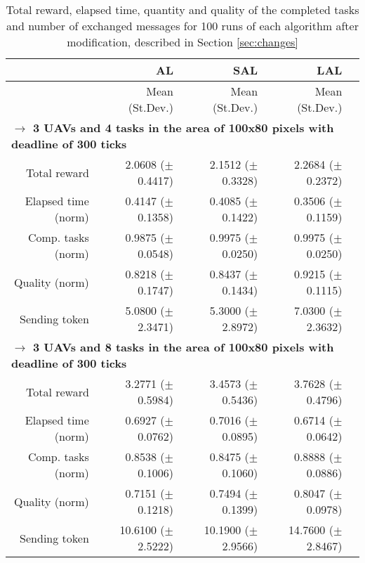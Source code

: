 \begin{table}%
	\small
	\fontsize{6}{6}\selectfont
	\centering
	\caption{Total reward, elapsed time, quantity and quality of the completed tasks and number of exchanged messages for 100 runs of each algorithm after modification, described in Section \ref{sec:changes}}
	\label{table:table06}
	
	\begin{tabular}{rrrrr} \hline
		& AL
		& SAL
		& LAL \\ \hline 
		
		& Mean (St.Dev.)  & Mean (St.Dev.)  & Mean (St.Dev.)  \\ [1ex]
		
		\multicolumn{5}{l}{\textbf{$\longrightarrow$ 3 UAVs and 4 tasks in the area of 100x80 pixels with deadline of 300 ticks }} \\
	Total reward           & 2.0608   ($\pm$0.4417)  &  2.1512  ($\pm$0.3328) & 2.2684  ($\pm$0.2372)   \\
	Elapsed time (norm)    & 0.4147   ($\pm$0.1358)  &  0.4085  ($\pm$0.1422) & 0.3506  ($\pm$0.1159)    \\ 
	Comp. tasks (norm)     & 0.9875   ($\pm$0.0548)  &  0.9975  ($\pm$0.0250) & 0.9975  ($\pm$0.0250)    \\ 
	Quality (norm)         & 0.8218   ($\pm$0.1747)  &  0.8437  ($\pm$0.1434) & 0.9215  ($\pm$0.1115)   \\ 
	Sending token          &  5.0800  ($\pm$2.3471)  &  5.3000  ($\pm$2.8972) & 7.0300  ($\pm$2.3632)   \\ [1ex]
		
		\multicolumn{5}{l}{\textbf{$\longrightarrow$ 3 UAVs and 8 tasks in the area of 100x80 pixels with deadline of 300 ticks}} \\
	Total reward           & 3.2771   ($\pm$0.5984)  &  3.4573  ($\pm$0.5436) & 3.7628  ($\pm$0.4796)   \\
	Elapsed time (norm)    & 0.6927   ($\pm$0.0762)  &  0.7016  ($\pm$0.0895) & 0.6714  ($\pm$0.0642)    \\ 
	Comp. tasks (norm)     & 0.8538   ($\pm$0.1006)  &  0.8475  ($\pm$0.1060) & 0.8888  ($\pm$0.0886)    \\ 
	Quality (norm)         & 0.7151  ($\pm$0.1218)   &  0.7494  ($\pm$0.1399) & 0.8047  ($\pm$0.0978)  \\ 
	Sending token          & 10.6100 ($\pm$2.5222)   & 10.1900  ($\pm$2.9566) & 14.7600 ($\pm$2.8467)  \\ [1ex]
	

\end{tabular}
\end{table}
